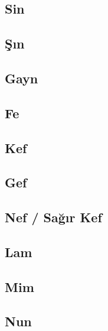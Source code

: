 \subsection*{Sin}
\uyumluharftablo{\arsin}{\Lsin\latdownsin}{\isimsin}{\trtlfsin}

\subsection*{Şın}
\uyumluharftablo{\arshin}{\Lshin\latdownshin}{\isimshin}{\trtlfshin}

\subsection*{Gayn}
\uyumluharftablo{\argayn}{\Lgayn\latdowngayn}{\isimgayn}{\trtlfgayn}

\subsection*{Fe}
\uyumluharftablo{\arfe}{\Lfe\latdownfe}{\isimfe}{\trtlffe}

\subsection*{Kef}
\uyumluharftablo{\arkef}{\Lkef\latdownkef}{\isimkef}{\trtlfkef}

\subsection*{Gef}
\uyumluharftablo{\argef}{\Lgef\latdowngef}{\isimgef}{\trtlfgef}

\subsection*{Nef / Sağır Kef}
\uyumluharftablo{\arnef}{\Lnef\latdownnef}{\isimnef}{\trtlfnef}

\subsection*{Lam}
\uyumluharftablo{\arlam}{\Llam\latdownlam}{\isimlam}{\trtlflam}

\subsection*{Mim}
\uyumluharftablo{\armim}{\Lmim\latdownmim}{\isimmim}{\trtlfmim}

\subsection*{Nun}
\uyumluharftablo{\arnun}{\Lnun\latdownnun}{\isimnun}{\trtlfnun}


